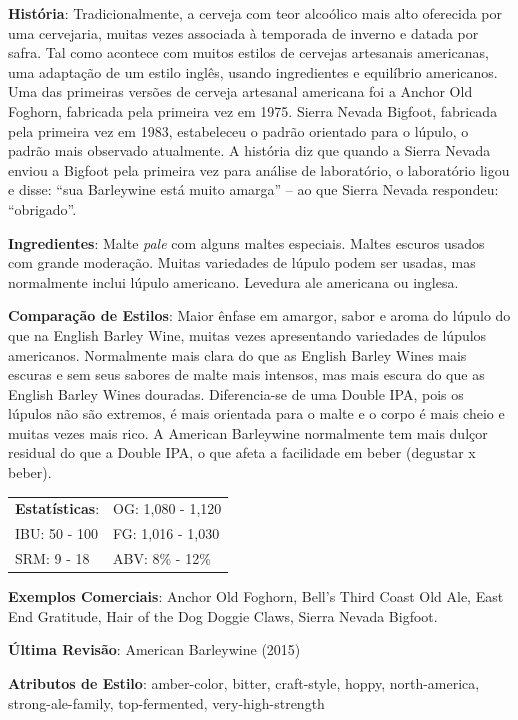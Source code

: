 \textbf{História}: Tradicionalmente, a cerveja com teor alcoólico mais alto oferecida por uma cervejaria, muitas vezes associada à temporada de inverno e datada por safra. Tal como acontece com muitos estilos de cervejas artesanais americanas, uma adaptação de um estilo inglês, usando ingredientes e equilíbrio americanos. Uma das primeiras versões de cerveja artesanal americana foi a Anchor Old Foghorn, fabricada pela primeira vez em 1975. Sierra Nevada Bigfoot, fabricada pela primeira vez em 1983, estabeleceu o padrão orientado para o lúpulo, o padrão mais observado atualmente. A história diz que quando a Sierra Nevada enviou a Bigfoot pela primeira vez para análise de laboratório, o laboratório ligou e disse: “sua Barleywine está muito amarga” – ao que Sierra Nevada respondeu: “obrigado”.

\textbf{Ingredientes}: Malte \textit{pale} com alguns maltes especiais. Maltes escuros usados com grande moderação. Muitas variedades de lúpulo podem ser usadas, mas normalmente inclui lúpulo americano. Levedura ale americana ou inglesa.

\textbf{Comparação de Estilos}: Maior ênfase em amargor, sabor e aroma do lúpulo do que na English Barley Wine, muitas vezes apresentando variedades de lúpulos americanos. Normalmente mais clara do que as English Barley Wines mais escuras e sem seus sabores de malte mais intensos, mas mais escura do que as English Barley Wines douradas. Diferencia-se de uma Double IPA, pois os lúpulos não são extremos, é mais orientada para o malte e o corpo é mais cheio e muitas vezes mais rico. A American Barleywine normalmente tem mais dulçor residual do que a Double IPA, o que afeta a facilidade em beber (degustar x beber).

\begin{tabular}{@{}p{35mm}p{35mm}@{}}
  \textbf{Estatísticas}: & OG: 1,080 - 1,120  \\
  IBU: 50 - 100  & FG: 1,016 - 1,030  \\
  SRM: 9 - 18 & ABV: 8\% - 12\%
\end{tabular}

\textbf{Exemplos Comerciais}: Anchor Old Foghorn, Bell's Third Coast Old Ale, East End Gratitude, Hair of the Dog Doggie Claws, Sierra Nevada Bigfoot.

\textbf{Última Revisão}: American Barleywine (2015)

\textbf{Atributos de Estilo}: amber-color, bitter, craft-style, hoppy, north-america, strong-ale-family, top-fermented, very-high-strength
